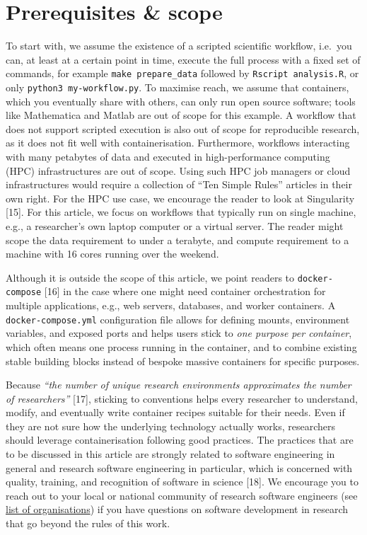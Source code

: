 \documentclass[10pt,letterpaper]{article}
\begin{document}
\hypertarget{prerequisites-scope}{%
\section{Prerequisites \& scope}\label{prerequisites-scope}}

To start with, we assume the existence of a scripted scientific
workflow, i.e.~you can, at least at a certain point in time, execute the
full process with a fixed set of commands, for example
\texttt{make\ prepare\_data} followed by \texttt{Rscript\ analysis.R},
or only \texttt{python3\ my-workflow.py}. To maximise reach, we assume
that containers, which you eventually share with others, can only run
open source software; tools like Mathematica and Matlab are out of scope
for this example. A workflow that does not support scripted execution is
also out of scope for reproducible research, as it does not fit well
with containerisation. Furthermore, workflows interacting with many
petabytes of data and executed in high-performance computing (HPC)
infrastructures are out of scope. Using such HPC job managers or cloud
infrastructures would require a collection of ``Ten Simple Rules''
articles in their own right. For the HPC use case, we encourage the
reader to look at Singularity {[}15{]}. For this article, we focus on
workflows that typically run on single machine, e.g., a researcher's own
laptop computer or a virtual server. The reader might scope the data
requirement to under a terabyte, and compute requirement to a machine
with 16 cores running over the weekend.

Although it is outside the scope of this article, we point readers to
\texttt{docker-compose} {[}16{]} in the case where one might need
container orchestration for multiple applications, e.g., web servers,
databases, and worker containers. A \texttt{docker-compose.yml}
configuration file allows for defining mounts, environment variables,
and exposed ports and helps users stick to \emph{one purpose per
container}, which often means one process running in the container, and
to combine existing stable building blocks instead of bespoke massive
containers for specific purposes.

Because \emph{``the number of unique research environments approximates
the number of researchers''} {[}17{]}, sticking to conventions helps
every researcher to understand, modify, and eventually write container
recipes suitable for their needs. Even if they are not sure how the
underlying technology actually works, researchers should leverage
containerisation following good practices. The practices that are to be
discussed in this article are strongly related to software engineering
in general and research software engineering in particular, which is
concerned with quality, training, and recognition of software in science
{[}18{]}. We encourage you to reach out to your local or national
community of research software engineers (see
\href{https://en.wikipedia.org/wiki/Research_software_engineering}{list
of organisations}) if you have questions on software development in
research that go beyond the rules of this work.
\end{document}
